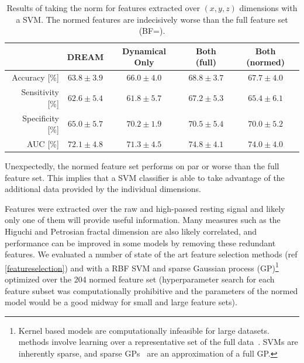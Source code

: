 \documentclass[12pt, twoside]{book}
\renewcommand\emph[1]{\textit{\color{USred}{#1}}}
\begin{document}
\begin{table}[h]
	\caption{Results of taking the norm for features extracted over $(x,y,z)$ dimensions with a SVM. The normed features are indecisively worse than the full feature set (BF=).}
	\label{accelerometernorm}
	\centering
	\begin{tabular}{@{}rcccc@{}}
		&  DREAM & Dynamical Only & Both (full) & Both (normed) \\ \midrule
		Accuracy [\%]    &      $63.8\pm3.9$ &                       $66.0\pm4.0$                                  &     $68.8\pm3.7$
		&						$67.7\pm4.0$\\ \midrule
		Sensitivity [\%] &      $62.6\pm5.4$ &                       $61.8\pm5.7$                                  &     $67.2\pm5.3$
		&					    $65.4\pm6.1$\\ \midrule
		Specificity [\%] &      $65.0\pm5.7$ &                       $70.2\pm1.9$                                  &     $70.5\pm5.4$
		&					    $70.0\pm5.2$\\ \midrule
		AUC [\%]         &      $72.1\pm4.8$ &                       $71.3\pm4.5$                                  &     $74.8\pm4.1$
		&				 		$74.0\pm4.0$\\ \midrule
	\end{tabular}
\end{table}

Unexpectedly, the normed feature set performs on par or worse than the full feature set. This implies that a SVM classifier is able to take advantage of the additional data provided by the individual dimensions. 


Features were extracted over the raw and high-passed resting signal and likely only one of them will provide useful information. Many measures such as the Higuchi and Petrosian fractal dimension are also likely correlated, and performance can be improved in some models by removing these redundant features. We evaluated a number of state of the art feature selection methods (ref \ref{featureselection}) and with a RBF SVM and sparse Gaussian process (GP)\footnote{Kernel based models are computationally infeasible for large datasets. \emph{Sparse} methods involve learning over a representative set of the full data~\cite{sparsematrix}. SVMs are inherently sparse, and sparse GPs~\cite{sparsegp} are an approximation of a full GP.} optimized over the 204 normed feature set (hyperparameter search for each feature subset was computationally prohibitive and the parameters of the normed model would be a good midway for small and large feature sets).
\end{document}
